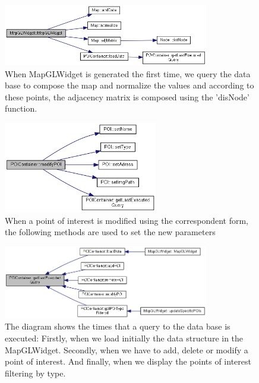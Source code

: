 \documentclass{article}
\begin{document}
\begin{figure}[h]
\centering
\includegraphics[width=0.8\textwidth]{6.png}
\caption{When MapGLWidget is generated the first time, we query the data base to compose the map and normalize the values and according to these points, the adjacency matrix is composed using the 'disNode' function.}
\end{figure}

\begin{figure}[h]
\centering
\includegraphics[width=0.6\textwidth]{8.png}
\caption{When a point of interest is modified using the correspondent form, the following methods are used to set the new parameters}
\end{figure}

\begin{figure}[h]
\centering
\includegraphics[width=0.8\textwidth]{9.png}
\caption{The diagram shows the times that a query to the data base is executed: Firstly, when we load initially the data structure in the MapGLWidget. Secondly, when we have to add, delete or modify a point of interest. And finally, when we display the points of interest filtering by type.}
\end{figure}
\end{document}
